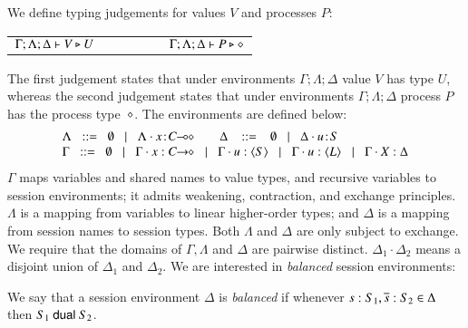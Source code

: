\noi We define typing judgements for values $V$ and processes $P$:
%
\begin{center}
	\begin{tabular}{c}
		$\Gamma; \Lambda; \Delta \vdash V \triangleright U \qquad \qquad \qquad \Gamma; \Lambda; \Delta \vdash P \triangleright \diamond$
	\end{tabular}
\end{center}
%
\noi The first judgement states that under environments $\Gamma; \Lambda; \Delta$ value $V$
has type $U$, whereas the second judgement states that under
environments $\Gamma; \Lambda; \Delta$ process $P$ has the process type~$\diamond$. The environments are defined below:
%
\[
	\begin{array}{l}
		\Lambda \bnfis  \emptyset \bnfbar \Lambda \cat \AT{x}{\lhot{C}}
		\quad\quad \Delta  \ \bnfis  \ \emptyset \bnfbar \Delta \cat \AT{u}{S}
		\\
		\Gamma  \bnfis  \emptyset \bnfbar \Gamma \cat \varp{x}: \shot{C} \bnfbar \Gamma \cat u: \chtype{S} \bnfbar \Gamma \cat u: \chtype{L} 
		\bnfbar \Gamma \cat \rvar{X}: \Delta
	\end{array}
\]
%
\noi 
$\Gamma$ maps variables and shared names to value types, and recursive 
variables to session environments;  
it admits weakening, contraction, and exchange principles.
$\Lambda$ is a mapping from variables to 
linear
higher-order
types; and $\Delta$ is a mapping from 
session names to session types. 
Both $\Lambda$ and $\Delta$
are
only subject to exchange.  
We require that the domains of $\Gamma,
\Lambda$ and $\Delta$ are pairwise distinct. 
$\Delta_1\cdot \Delta_2$ means 
a disjoint union of $\Delta_1$ and $\Delta_2$.  
We are interested in \emph{balanced} session environments: 

\smallskip

\begin{definition}[Balanced]\label{d:wtenv}%
	We say that a session environment $\Delta$ is {\em balanced} if whenever
	$s: S_1, \overline{s}: S_2 \in \Delta$ then $S_1 \ \mathsf{dual}\  S_2$.
\end{definition}

